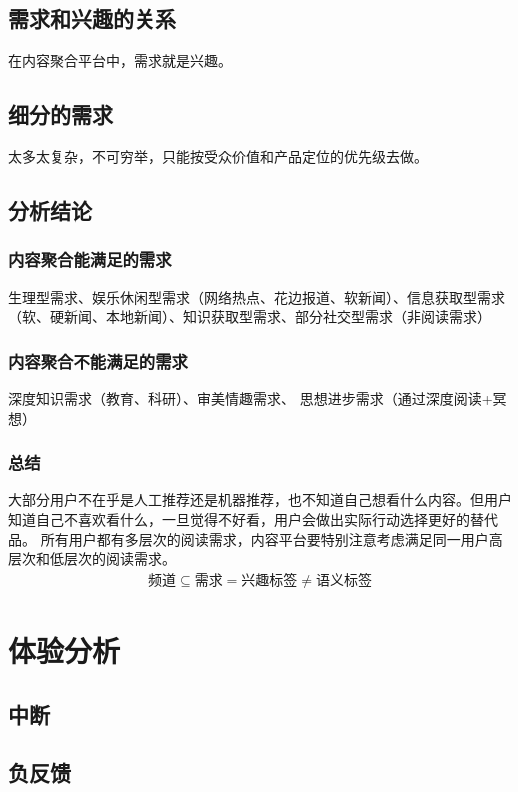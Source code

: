 \documentclass[11pt]{article}
\begin{document}
\subsection{需求和兴趣的关系}
在内容聚合平台中，需求就是兴趣。

\subsection{细分的需求}
太多太复杂，不可穷举，只能按受众价值和产品定位的优先级去做。

\subsection{分析结论}
\subsubsection{内容聚合能满足的需求}
生理型需求、娱乐休闲型需求（网络热点、花边报道、软新闻）、信息获取型需求（软、硬新闻、本地新闻）、知识获取型需求、部分社交型需求（非阅读需求）
\subsubsection{内容聚合不能满足的需求}
深度知识需求（教育、科研）、审美情趣需求、
思想进步需求（通过深度阅读+冥想）

\subsubsection{总结}
大部分用户不在乎是人工推荐还是机器推荐，也不知道自己想看什么内容。但用户知道自己不喜欢看什么，一旦觉得不好看，用户会做出实际行动选择更好的替代品。
所有用户都有多层次的阅读需求，内容平台要特别注意考虑满足同一用户高层次和低层次的阅读需求。
\begin{eqnarray}
\text{频道} \subseteq \text{需求} = \text{兴趣标签} \neq \text{语义标签}
\end{eqnarray}

%
\section{体验分析}

\subsection{中断}
\subsection{负反馈}
\end{document}
